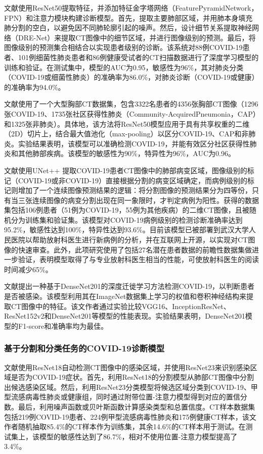 \documentclass[journal,twoside,web]{ieeecolor}
\begin{document}
文献\cite{b4}使用ResNet50\cite{b5}提取特征，并添加特征金字塔网络（FeaturePyramidNetwork，FPN）\cite{b6}和注意力模块\cite{b7}构建诊断模型。首先，提取主要肺部区域，并用肺本身填充肺分割的空白，以避免因不同肺轮廓引起的噪声。然后，设计细节关系提取神经网络（DRE-Net）来提取CT图像中的细节区域，并进行图像级别的预测。最后，将图像级别的预测集合相结合以实现患者级别的诊断。该系统对88例COVID-19患者、101例细菌性肺炎患者和86例健康受试者的CT扫描数据进行了深度学习模型的训练和验证。在测试集中，模型的AUC为0.95，敏感性为96\%，其对肺炎分类（COVID-19或细菌性肺炎）的准确率为86.0\%，对肺炎诊断（COVID-19或健康）的准确率为94.0\%。

文献\cite{b8}使用了一个大型胸部CT数据集，包含3322名患者的4356张胸部CT图像（1296张COVID-19、1735张社区获得性肺炎（Community-AcquiredPneumonia，CAP）和1325张非肺炎）。具体地，该方法将ResNet50模型应用于具有共享权重的二维（2D）切片上，结合最大值池化（max-pooling）以区分COVID-19、CAP和非肺炎。实验结果表明，该模型可以准确检测COVID-19，并能有效区分社区获得性肺炎和其他肺部疾病。该模型的敏感性为90\%，特异性为96\%，AUC为0.96。

文献\cite{b9}使用UNet++\cite{b10} \cite{b11}提取COVID-19患者CT图像中的肺部病变区域，图像级别的标记（COVID-19或非COVID-19）直接根据分割的病变区域确定，而病例级别的标记则增加了一个连续图像预测结果的逻辑：将分割图像的预测结果分为四等份，只有当三张连续图像的病变分割出现在同一象限时，才判定病例为阳性。获得的数据集包括106例患者（51例为COVID-19，55例为其他疾病）的二维CT图像，且被随机分为训练集和验证集。该模型对COVID-19病例级别的检测诊断准确率达到95.2\%，敏感性达到100\%，特异性达到93.6\%。目前该模型已被部署到武汉大学人民医院以帮助放射科医生进行新病例的分析，并在互联网上开源，以实现对CT图像的快速审查。此外，此项研究使用了包括27名潜在患者数据的前瞻性数据集做进一步验证，表明模型取得了与专业放射科医生相当的性能，可使放射科医生的阅读时间减少65\%。

文献\cite{b12}提出一种基于DenseNet201的深度迁徙学习方法检测COVID-19，以判断患者是否被感染。该模型利用其在ImageNet数据集上学习的权值和卷积神经结构来提取CT图像中的特征。该文作者通过实验比较VGG16、InceptionResNet、ResNet152v2和DenseNet201等模型的性能表现。实验结果表明，DenseNet201模型的F1-score和准确率均为最佳。

\subsubsection{基于分割和分类任务的COVID-19诊断模型}

文献\cite{b13}使用ResNet18\cite{b14}自动检测CT图像中的感染区域，并使用ResNet23来识别感染区域是否为COVID-19症状。首先，利用ResNet18的分割模型从肺部CT图像中分割出候选感染区域。然后，利用ResNet23分类模型将候选区域分类到COVID-19、甲型流感病毒性肺炎或健康组，同时通过附带位置-注意力模型得到对应的置信分数。最后，利用噪声函数或贝叶斯函数计算感染类型和总置信度。CT样本数据集包括219例COVID-19患者、224例甲型流感病毒性肺炎和175例健康CT样本，该文作者随机抽取85.4\%的CT样本作为训练集，其余14.6\%的CT样本用于测试。在测试集上，该模型的敏感性达到了86.7\%，相对不使用位置-注意力模型提高了3.4\%。
\end{document}
